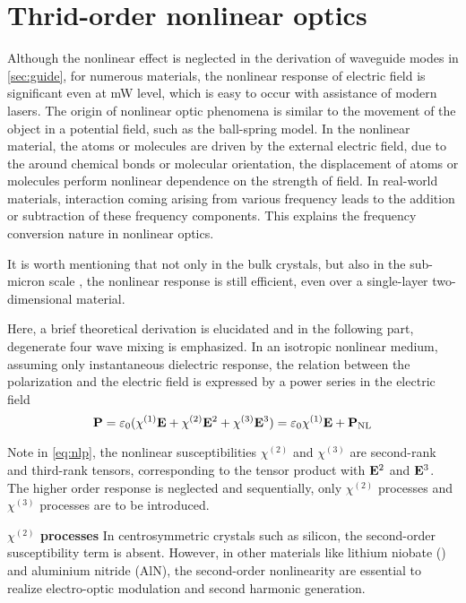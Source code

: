 \documentclass[final]{kuee_en}
\begin{document}
\section{Thrid-order nonlinear optics}

Although the nonlinear effect is neglected in the derivation of waveguide modes in \autoref{sec:guide}, 
for numerous materials, the nonlinear response of electric field is significant even at mW level, which is easy to occur with assistance of modern lasers. The origin of nonlinear optic phenomena is similar to the movement of the object in a potential field, such as the ball-spring model. In the nonlinear material, the atoms or molecules are driven by the external electric field, due to the around chemical bonds or molecular orientation, the displacement of atoms or molecules perform nonlinear dependence on the strength of field. In real-world materials, interaction coming arising from various frequency leads to the addition or subtraction of these frequency components. This explains the frequency conversion nature in nonlinear optics.

It is worth mentioning that not only in the bulk crystals, but also in the sub-micron scale \cite{Leuthold2010}, the nonlinear response is still efficient, even over a single-layer two-dimensional material.

Here, a brief theoretical derivation is elucidated and in the following part, degenerate four wave mixing is emphasized. In an isotropic nonlinear medium, assuming only instantaneous dielectric response, the relation between the polarization and the electric field is expressed by a power series in the electric field
\begin{equation}\label{eq:nlp}
    \vb{P} = \varepsilon_0 \large (\chi^{(1)}\vb{E} + \chi^{(2)}\vb{E}^2 + \chi^{(3)}\vb{E}^3)
    = \varepsilon_0 \chi^{(1)}\vb{E} + \vb{P}_\mathrm{NL}
\end{equation}

Note in \autoref{eq:nlp}, the nonlinear susceptibilities $\chi^{(2)}$ and $\chi^{(3)}$ are second-rank and third-rank tensors, corresponding to the tensor product with $\vb{E}^2$ and $\vb{E}^3$. The higher order response is neglected and sequentially, only $\chi^{(2)}$ processes and $\chi^{(3)}$ processes are to be introduced.

\textbf{$\chi^{(2)}$ processes} In centrosymmetric crystals such as silicon, the second-order susceptibility term is absent. However, in other materials like lithium niobate () and aluminium nitride (AlN), the second-order nonlinearity are essential to realize electro-optic modulation and second harmonic generation.
\end{document}
